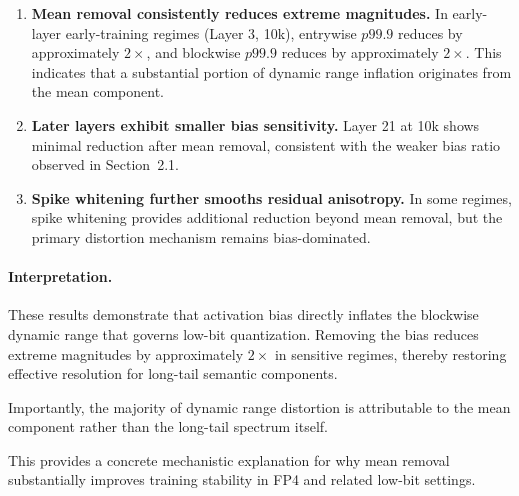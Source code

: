 \begin{enumerate}
\item \textbf{Mean removal consistently reduces extreme magnitudes.}
In early-layer early-training regimes (Layer 3, 10k),
entrywise $p99.9$ reduces by approximately $2\times$,
and blockwise $p99.9$ reduces by approximately $2\times$.
This indicates that a substantial portion of dynamic range inflation
originates from the mean component.

\item \textbf{Later layers exhibit smaller bias sensitivity.}
Layer 21 at 10k shows minimal reduction after mean removal,
consistent with the weaker bias ratio observed in Section~2.1.

\item \textbf{Spike whitening further smooths residual anisotropy.}
In some regimes, spike whitening provides additional reduction
beyond mean removal, but the primary distortion mechanism remains
bias-dominated.
\end{enumerate}

\paragraph{Interpretation.}

These results demonstrate that activation bias directly inflates
the blockwise dynamic range that governs low-bit quantization.
Removing the bias reduces extreme magnitudes by approximately
$2\times$ in sensitive regimes, thereby restoring effective
resolution for long-tail semantic components.

Importantly, the majority of dynamic range distortion is attributable
to the mean component rather than the long-tail spectrum itself.

This provides a concrete mechanistic explanation for why mean removal
substantially improves training stability in FP4 and related
low-bit settings.
